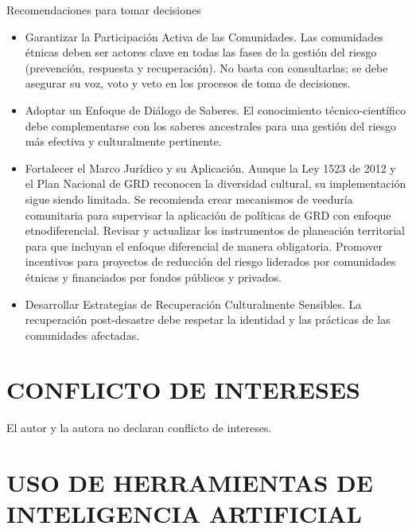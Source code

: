 \documentclass[
  spanish,
  letterpaper,
]{book}
\providecommand{\tightlist}{%
  \setlength{\itemsep}{0pt}\setlength{\parskip}{0pt}}
\begin{document}
\begin{tcolorbox}[enhanced jigsaw, rightrule=.15mm, colframe=quarto-callout-important-color-frame, opacityback=0, arc=.35mm, bottomrule=.15mm, toprule=.15mm, breakable, colback=white, leftrule=.75mm, left=2mm]

Recomendaciones para tomar decisiones

\begin{itemize}
\tightlist
\item
  Garantizar la Participación Activa de las Comunidades. Las comunidades
  étnicas deben ser actores clave en todas las fases de la gestión del
  riesgo (prevención, respuesta y recuperación). No basta con
  consultarlas; se debe asegurar su voz, voto y veto en los procesos de
  toma de decisiones.
\item
  Adoptar un Enfoque de Diálogo de Saberes. El conocimiento
  técnico-científico debe complementarse con los saberes ancestrales
  para una gestión del riesgo más efectiva y culturalmente pertinente.
\item
  Fortalecer el Marco Jurídico y su Aplicación. Aunque la Ley 1523 de
  2012 y el Plan Nacional de GRD reconocen la diversidad cultural, su
  implementación sigue siendo limitada. Se recomienda crear mecanismos
  de veeduría comunitaria para supervisar la aplicación de políticas de
  GRD con enfoque etnodiferencial. Revisar y actualizar los instrumentos
  de planeación territorial para que incluyan el enfoque diferencial de
  manera obligatoria. Promover incentivos para proyectos de reducción
  del riesgo liderados por comunidades étnicas y financiados por fondos
  públicos y privados.
\item
  Desarrollar Estrategias de Recuperación Culturalmente Sensibles. La
  recuperación post-desastre debe respetar la identidad y las prácticas
  de las comunidades afectadas.
\end{itemize}

\end{tcolorbox}


\chapter{CONFLICTO DE INTERESES}\label{conflicto-de-intereses}

El autor y la autora no declaran conflicto de intereses.


\chapter{USO DE HERRAMIENTAS DE INTELIGENCIA
ARTIFICIAL}\label{uso-de-herramientas-de-inteligencia-artificial}
\end{document}
